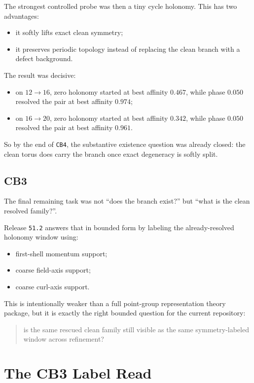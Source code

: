 \documentclass[11pt]{article}
\begin{document}
The strongest controlled probe was then a tiny cycle holonomy. This has two advantages:
\begin{itemize}
\item it softly lifts exact clean symmetry;
\item it preserves periodic topology instead of replacing the clean branch with a defect background.
\end{itemize}

The result was decisive:
\begin{itemize}
\item on \(12 \rightarrow 16\), zero holonomy started at best affinity \(0.467\), while phase \(0.050\) resolved the pair at best affinity \(0.974\);
\item on \(16 \rightarrow 20\), zero holonomy started at best affinity \(0.342\), while phase \(0.050\) resolved the pair at best affinity \(0.961\).
\end{itemize}

So by the end of \texttt{CB4}, the substantive existence question was already closed: the clean torus does carry the branch once exact degeneracy is softly split.

\subsection{CB3}

The final remaining task was not ``does the branch exist?'' but ``what is the clean resolved family?''.

Release \texttt{51.2} answers that in bounded form by labeling the already-resolved holonomy window using:
\begin{itemize}
\item first-shell momentum support;
\item coarse field-axis support;
\item coarse curl-axis support.
\end{itemize}

This is intentionally weaker than a full point-group representation theory package, but it is exactly the right bounded question for the current repository:

\begin{quote}
is the same rescued clean family still visible as the same symmetry-labeled window across refinement?
\end{quote}

\section{The CB3 Label Read}
\end{document}

